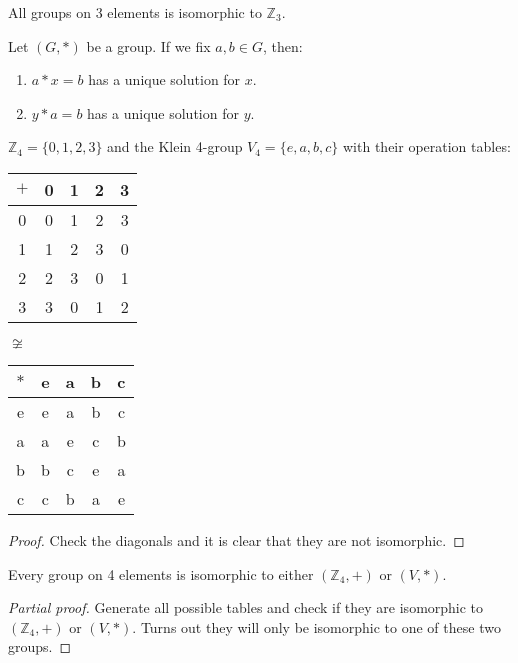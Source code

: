 \begin{remark}[Fact]
    All groups on 3 elements is isomorphic to $\mathbb{Z}_3$.
\end{remark}

\begin{theorem}
    Let $(G, *)$ be a group. If we fix $a, b \in G$, then:
    \begin{enumerate}
        \item $a*x=b$ has a unique solution for $x$.
        \item $y*a=b$ has a unique solution for $y$.
    \end{enumerate}
\end{theorem}

\begin{eg}
    $\mathbb{Z}_4 = \{0, 1, 2, 3\}$ and the Klein 4-group $V_4 = \{e, a, b, c\}$ with their operation tables:\\
    \begin{center}
        \begin{tabular}{c|cccc}
            $+$ & 0 & 1 & 2 & 3\\
            \hline
            0 & 0 & 1 & 2 & 3\\
            1 & 1 & 2 & 3 & 0\\
            2 & 2 & 3 & 0 & 1\\
            3 & 3 & 0 & 1 & 2\\
        \end{tabular}
        \quad $\not\cong$ \quad
        \begin{tabular}{c|cccc}
            $*$ & e & a & b & c\\
            \hline
            e & e & a & b & c\\
            a & a & e & c & b\\
            b & b & c & e & a\\
            c & c & b & a & e\\
        \end{tabular}
    \end{center}
\end{eg}
\begin{proof}
    Check the diagonals and it is clear that they are not isomorphic.
\end{proof}

\begin{theorem}
    Every group on 4 elements is isomorphic to either $(\mathbb{Z}_4, +)$ or $(V, *)$.
\end{theorem}
\begin{proof}[Partial proof]
    Generate all possible tables and check if they are isomorphic to $(\mathbb{Z}_4, +)$ or $(V, *)$. Turns out they will only be isomorphic to one of these two groups.
\end{proof}